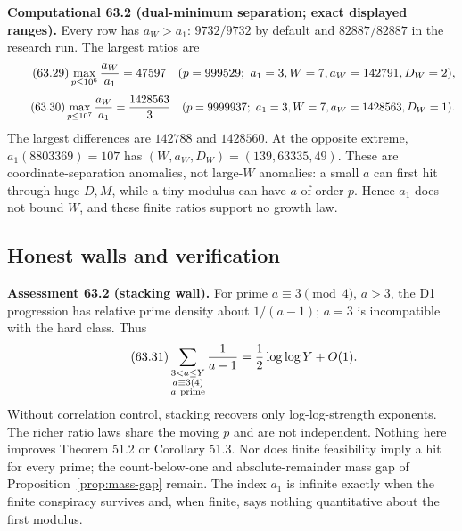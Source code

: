\documentclass[10pt,reqno]{amsart}
\theoremstyle{definition}
\newcommand{\1}{\mathbf 1}
\begin{document}
\medskip\noindent\textbf{Computational 63.2 (dual-minimum separation;
exact displayed ranges).}
Every row has $a_W>a_1$: $9732/9732$ by default and $82887/82887$ in the
research run.  The largest ratios are
\begin{equation}\tag{63.29}
 \max_{p\leq10^6}{a_W\over a_1}=47597
 \quad(p=999529;\ a_1=3,W=7,a_W=142791,D_W=2),
\end{equation}
\begin{equation}\tag{63.30}
 \max_{p\leq10^7}{a_W\over a_1}={1428563\over3}
 \quad(p=9999937;\ a_1=3,W=7,a_W=1428563,D_W=1).
\end{equation}
The largest differences are $142788$ and $1428560$.  At the opposite
extreme, $a_1(8803369)=107$ has
$(W,a_W,D_W)=(139,63335,49)$.  These are coordinate-separation anomalies,
not large-$W$ anomalies: a small $a$ can first hit through huge $D,M$, while
a tiny modulus can have $a$ of order $p$.  Hence $a_1$ does not bound $W$,
and these finite ratios support no growth law.

\subsection{Honest walls and verification}
\medskip\noindent\textbf{Assessment 63.2 (stacking wall).}
For prime $a\equiv3\pmod4$, $a>3$, the D1 progression has relative prime
density about $1/(a-1)$; $a=3$ is incompatible with the hard class.  Thus
\begin{equation}\tag{63.31}
 \sum_{\substack{3<a\leq Y\\a\equiv3(4)\\a\ \mathrm{prime}}}{1\over a-1}
 ={1\over2}\log\log Y+O(1).
\end{equation}
Without correlation control, stacking recovers only log-log-strength
exponents.  The richer ratio laws share the moving $p$ and are not
independent.  Nothing here improves Theorem 51.2 or Corollary 51.3.  Nor
does finite feasibility imply a hit for every prime; the count-below-one
and absolute-remainder mass gap of Proposition~\ref{prop:mass-gap} remain.
The index $a_1$ is infinite exactly when the finite conspiracy survives and,
when finite, says nothing quantitative about the first modulus.
\end{document}
